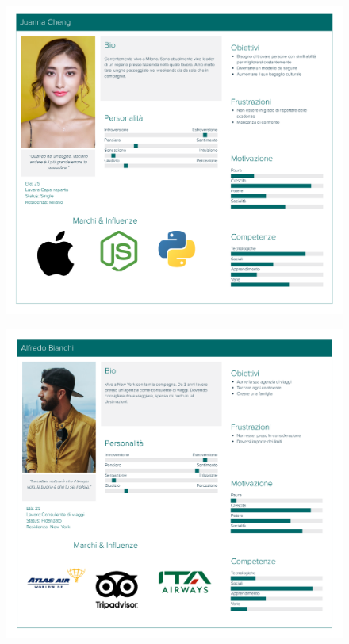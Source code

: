 \documentclass{natourDoc}
\begin{document}
\begin{figure}[!htbp]
	\centering
	\includegraphics[width=\textwidth]{./personas/personas-cheng.pdf}
\end{figure}

\begin{figure}[!htbp]
	\centering
	\includegraphics[width=\textwidth]{./personas/personas-bianchi.pdf}
\end{figure}
\end{document}
